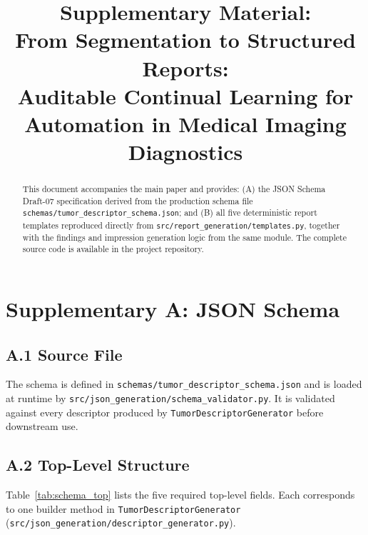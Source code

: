 \documentclass[conference]{IEEEtran}
\begin{document}
\title{Supplementary Material:\\
From Segmentation to Structured Reports:\\
Auditable Continual Learning for Automation in Medical Imaging Diagnostics}

\author{
}

\maketitle

\begin{abstract}
This document accompanies the main paper and provides: (A) the JSON Schema Draft-07 specification derived from the production schema file \texttt{schemas/tumor\_descriptor\_schema.json}; and (B) all five deterministic report templates reproduced directly from \texttt{src/report\_generation/templates.py}, together with the findings and impression generation logic from the same module. The complete source code is available in the project repository.
\end{abstract}

\section*{Supplementary A: JSON Schema}

\subsection*{A.1 Source File}

The schema is defined in \texttt{schemas/tumor\_descriptor\_schema.json} and is loaded at runtime by \texttt{src/json\_generation/schema\_validator.py}. It is validated against every descriptor produced by \texttt{TumorDescriptorGenerator} before downstream use.

\subsection*{A.2 Top-Level Structure}

Table~\ref{tab:schema_top} lists the five required top-level fields. Each corresponds to one builder method in \texttt{TumorDescriptorGenerator} (\texttt{src/json\_generation/descriptor\_generator.py}).
\end{document}
